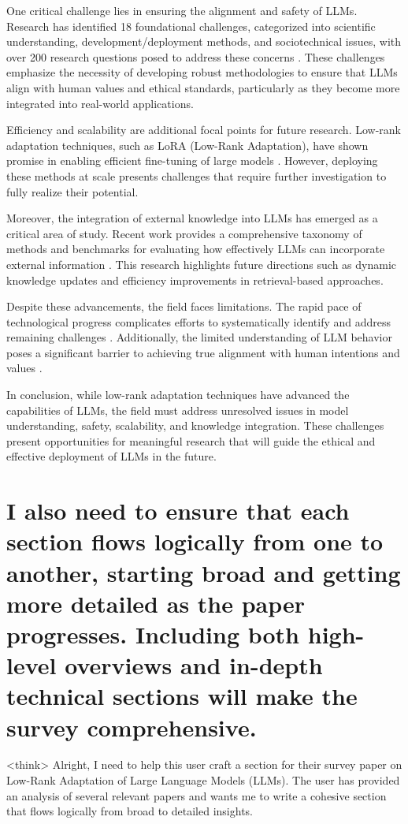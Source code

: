 \documentclass[conference]{IEEEtran}
\begin{document}
One critical challenge lies in ensuring the alignment and safety of LLMs. Research has identified 18 foundational challenges, categorized into scientific understanding, development/deployment methods, and sociotechnical issues, with over 200 research questions posed to address these concerns \cite{b3}. These challenges emphasize the necessity of developing robust methodologies to ensure that LLMs align with human values and ethical standards, particularly as they become more integrated into real-world applications.

Efficiency and scalability are additional focal points for future research. Low-rank adaptation techniques, such as LoRA (Low-Rank Adaptation), have shown promise in enabling efficient fine-tuning of large models \cite{b4}. However, deploying these methods at scale presents challenges that require further investigation to fully realize their potential.

Moreover, the integration of external knowledge into LLMs has emerged as a critical area of study. Recent work provides a comprehensive taxonomy of methods and benchmarks for evaluating how effectively LLMs can incorporate external information \cite{b5}. This research highlights future directions such as dynamic knowledge updates and efficiency improvements in retrieval-based approaches.

Despite these advancements, the field faces limitations. The rapid pace of technological progress complicates efforts to systematically identify and address remaining challenges \cite{b2}. Additionally, the limited understanding of LLM behavior poses a significant barrier to achieving true alignment with human intentions and values \cite{b3}.

In conclusion, while low-rank adaptation techniques have advanced the capabilities of LLMs, the field must address unresolved issues in model understanding, safety, scalability, and knowledge integration. These challenges present opportunities for meaningful research that will guide the ethical and effective deployment of LLMs in the future.

\section{I also need to ensure that each section flows logically from one to another, starting broad and getting more detailed as the paper progresses. Including both high-level overviews and in-depth technical sections will make the survey comprehensive.}
<think>
Alright, I need to help this user craft a section for their survey paper on Low-Rank Adaptation of Large Language Models (LLMs). The user has provided an analysis of several relevant papers and wants me to write a cohesive section that flows logically from broad to detailed insights. 
\end{document}
